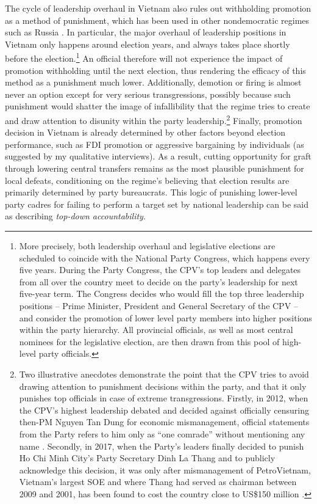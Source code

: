 \documentclass[12pt]{article}
\newcommand{\1}{\mathbbm{1}}
\begin{document}
The cycle of leadership overhaul in Vietnam also rules out withholding promotion as a method of punishment, which has been used in other nondemocratic regimes such as Russia \citep[][136]{Myagkov2009}. In particular, the major overhaul of leadership positions in Vietnam only happens around election years, and always takes place shortly before the election.\footnote{More precisely, both leadership overhaul and legislative elections are scheduled to coincide with the National Party Congress, which happens every five years. During the Party Congress, the CPV's top leaders and delegates from all over the country meet to decide on the party's leadership for next five-year term. The Congress decides who would fill the top three leadership positions -- Prime Minister, President and General Secretary of the CPV -- and consider the promotion of lower level party members into higher positions within the party hierarchy. All provincial officials, as well as most central nominees for the legislative election, are then drawn from this pool of high-level party officials.} An official therefore will not experience the impact of promotion withholding until the next election, thus rendering the efficacy of this method as a punishment much lower. Additionally, demotion or firing is almost never an option except for very serious transgressions, possibly because such punishment would shatter the image of infallibility that the regime tries to create and draw attention to disunity within the party leadership.\footnote{Two illustrative anecdotes demonstrate the point that the CPV tries to avoid drawing attention to punishment decisions within the party, and that it only punishes top officials in case of extreme transgressions. Firstly, in 2012, when the CPV's highest leadership debated and decided against officially censuring then-PM Nguyen Tan Dung for economic mismanagement, official statements from the Party refers to him only as ``one comrade'' without mentioning any name \citep{voa2012}. Secondly, in 2017, when the Party's leaders finally decided to punish Ho Chi Minh City's Party Secretary Dinh La Thang and to publicly acknowledge this decision, it was only after mismanagement of PetroVietnam, Vietnam's largest SOE and where Thang had served as chairman between 2009 and 2001, has been found to cost the country close to US\$150 million \citep{BBC2017}.} Finally, promotion decision in Vietnam is already determined by other factors beyond election performance, such as FDI promotion \citep{JensenMalesky2018} or aggressive bargaining by individuals (as suggested by my qualitative interviews). As a result, cutting opportunity for graft through lowering central transfers remains as the most plausible punishment for local defeats, conditioning on the regime’s believing that election results are primarily determined by party bureaucrats. This logic of punishing lower-level party cadres for failing to perform a target set by national leadership can be said as describing \textit{top-down accountability}.
\end{document}
